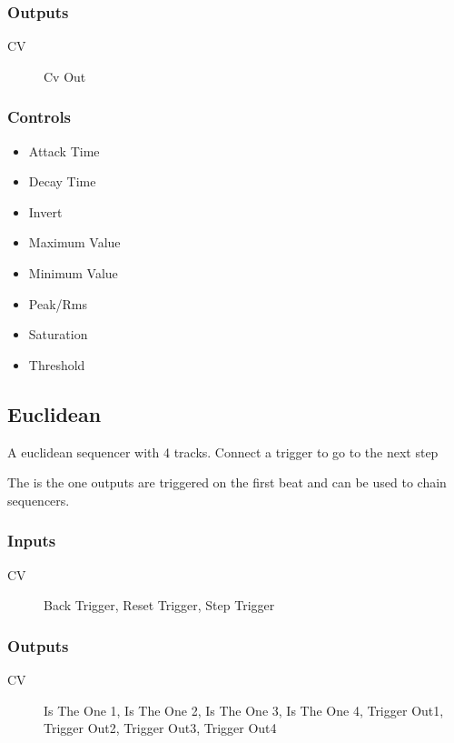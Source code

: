 \subsubsection{Outputs}
\begin{description}
\item [CV] Cv Out
\end{description}

\subsubsection{Controls}
\begin{itemize}
\item Attack Time
\item Decay Time
\item Invert
\item Maximum Value
\item Minimum Value
\item Peak/Rms
\item Saturation
\item Threshold
\end{itemize}

\subsection{Euclidean}

A euclidean sequencer with 4 tracks. Connect a trigger to go to the next step

The is the one outputs are triggered on the first beat and can be used to chain sequencers.

\subsubsection{Inputs}
\begin{description}
\item [CV] Back Trigger, Reset Trigger, Step Trigger
\end{description}

\subsubsection{Outputs}
\begin{description}
\item [CV] Is The One 1, Is The One 2, Is The One 3, Is The One 4, Trigger Out1, Trigger Out2, Trigger Out3, Trigger Out4
\end{description}

